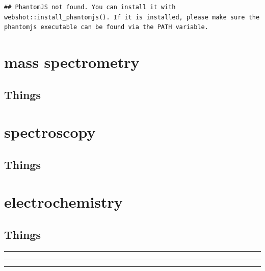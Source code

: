 \documentclass[
]{krantz}
\begin{document}
\begin{verbatim}
## PhantomJS not found. You can install it with webshot::install_phantomjs(). If it is installed, please make sure the phantomjs executable can be found via the PATH variable.
\end{verbatim}

\hypertarget{mass-spectrometry}{%
\section*{mass spectrometry}\label{mass-spectrometry}}

\hypertarget{things}{%
\subsection{Things}\label{things}}

\hypertarget{spectroscopy}{%
\section*{spectroscopy}\label{spectroscopy}}

\hypertarget{things-1}{%
\subsection{Things}\label{things-1}}

\hypertarget{electrochemistry}{%
\section*{electrochemistry}\label{electrochemistry}}

\hypertarget{things-2}{%
\subsection{Things}\label{things-2}}

\begin{center}\rule{0.5\linewidth}{0.5pt}\end{center}

\begin{center}\rule{0.5\linewidth}{0.5pt}\end{center}

\begin{center}\rule{0.5\linewidth}{0.5pt}\end{center}
\end{document}
